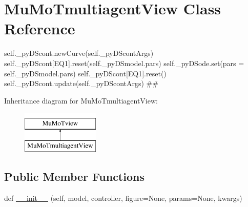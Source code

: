 \hypertarget{class_mu_mo_t_1_1_mu_mo_tmultiagent_view}{}\section{Mu\+Mo\+Tmultiagent\+View Class Reference}
\label{class_mu_mo_t_1_1_mu_mo_tmultiagent_view}


self.\+\_\+py\+D\+Scont.\+new\+Curve(self.\+\_\+py\+D\+Scont\+Args) self.\+\_\+py\+D\+Scont\mbox{[}\textquotesingle{}E\+Q1\textquotesingle{}\mbox{]}.reset(self.\+\_\+py\+D\+Smodel.\+pars) self.\+\_\+py\+D\+Sode.\+set(pars = self.\+\_\+py\+D\+Smodel.\+pars) self.\+\_\+py\+D\+Scont\mbox{[}\textquotesingle{}E\+Q1\textquotesingle{}\mbox{]}.reset() self.\+\_\+py\+D\+Scont.\+update(self.\+\_\+py\+D\+Scont\+Args) \#\#  


Inheritance diagram for Mu\+Mo\+Tmultiagent\+View\+:\begin{figure}[H]
\begin{center}
\leavevmode
\includegraphics[height=2.000000cm]{class_mu_mo_t_1_1_mu_mo_tmultiagent_view}
\end{center}
\end{figure}
\subsection*{Public Member Functions}
\begin{DoxyCompactItemize}
\item 
def \hyperlink{class_mu_mo_t_1_1_mu_mo_tmultiagent_view_a367325b3bd7ca4a7b7ec4107f9aa6a16}{\+\_\+\+\_\+init\+\_\+\+\_\+} (self, model, controller, figure=None, params=None, kwargs)
\end{DoxyCompactItemize}
